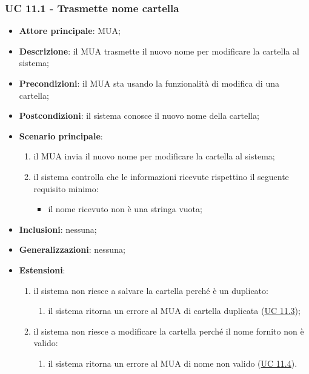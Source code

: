 \subsubsection{UC 11.1 - Trasmette nome cartella} \label{sec:UC11.1}
\begin{itemize}
    \item \textbf{Attore principale}: MUA;
    \item \textbf{Descrizione}: il MUA trasmette il nuovo nome per modificare la cartella al sistema;
    \item \textbf{Precondizioni}: il MUA sta usando la funzionalità di modifica di una cartella;
    \item \textbf{Postcondizioni}: il sistema conosce il nuovo nome della cartella;
    \item \textbf{Scenario principale}:
        \begin{enumerate}
            \item il MUA invia il nuovo nome per modificare la cartella al sistema;
            \item il sistema controlla che le informazioni ricevute rispettino il seguente requisito minimo:
            \begin{itemize}
                \item il nome ricevuto non è una stringa vuota;
            \end{itemize}
        \end{enumerate}
    \item \textbf{Inclusioni}: nessuna;
    \item \textbf{Generalizzazioni}: nessuna;
    \item \textbf{Estensioni}:
        \begin{enumerate}[label=\alph*.]
            \item il sistema non riesce a salvare la cartella perché è un duplicato:
            \begin{enumerate}[label=\arabic*.]
                \item il sistema ritorna un errore al MUA di cartella duplicata (\hyperref[sec:UC11.3]{UC 11.3});
            \end{enumerate}
            \item il sistema non riesce a modificare la cartella perché il nome fornito non è valido:
            \begin{enumerate}[label=\arabic*.]
                \item il sistema ritorna un errore al MUA di nome non valido (\hyperref[sec:UC11.4]{UC 11.4}).
            \end{enumerate}
        \end{enumerate}
\end{itemize}

